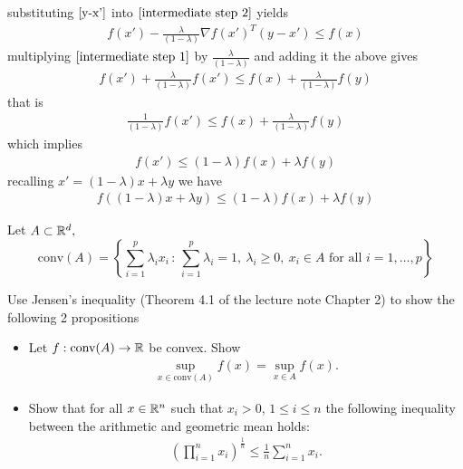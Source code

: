 \documentclass{ExerciseSheet}
\begin{document}
\begin{solution}
\begin{itemize}
    substituting $\eqref{y-x'}$ into $\eqref{intermediate step 2}$ yields
     \begin{align*}
         f(x') -\frac{\lambda}{(1-\lambda)}\nabla f(x')^T(y-x')\leq f(x)
     \end{align*}
    multiplying $\eqref{intermediate step 1}$ by $\frac{\lambda}{(1-\lambda)}$ and adding it the above gives
        \begin{align*}
           f(x')+ \frac{\lambda}{(1-\lambda)}f(x') \leq f(x) + \frac{\lambda}{(1-\lambda)}f(y)
        \end{align*}
    that is
     \begin{align*}
            \frac{1}{(1-\lambda)}f(x') \leq f(x) + \frac{\lambda}{(1-\lambda)}f(y)
        \end{align*}
    which implies
        \begin{align*}
            f(x') \leq (1-\lambda)f(x) + \lambda f(y)
        \end{align*}
    recalling $x'=(1-\lambda)x+\lambda y$ we have
     \begin{align*}
            f((1-\lambda)x+\lambda y) \leq (1-\lambda)f(x) + \lambda f(y)
        \end{align*}
\end{itemize}

\end{solution}

\fi

\vskip 0.5cm
\begin{problem}
 Let $A\subset \mathbb{R}^d,$ $$\text{conv}(A)=\left\{\displaystyle\sum_{i=1}^p\lambda_i x_i\,:\,\displaystyle\sum_{i=1}^p\lambda_i=1,~\lambda_i\geq 0,~ x_i \in A\text{ for all } i=1,\ldots,p\right\}$$

\item Use Jensen's inequality (Theorem 4.1 of the lecture note Chapter 2) to show the following 2 propositions
\begin{itemize}
    \item Let $f:\text{conv}(A)\rightarrow \mathbb{R}$ be convex. Show 
    \begin{align*}
     \sup_{x \in \text{conv}(A)} f(x)=\sup_{x\in A} f(x). 
    \end{align*}

    \item Show that for all $x\in \mathbb{R}^n$ such that $x_i >0$, $1\leq i\leq n$ the following inequality between the arithmetic and geometric mean holds:
	\begin{align*}
	\left( \prod_{i=1}^n x_i \right)^{\frac{1}{n}} \leq \frac{1}{n} \sum_{i=1}^n x_i.
	\end{align*}
 \end{itemize}


\end{problem}
\end{document}
